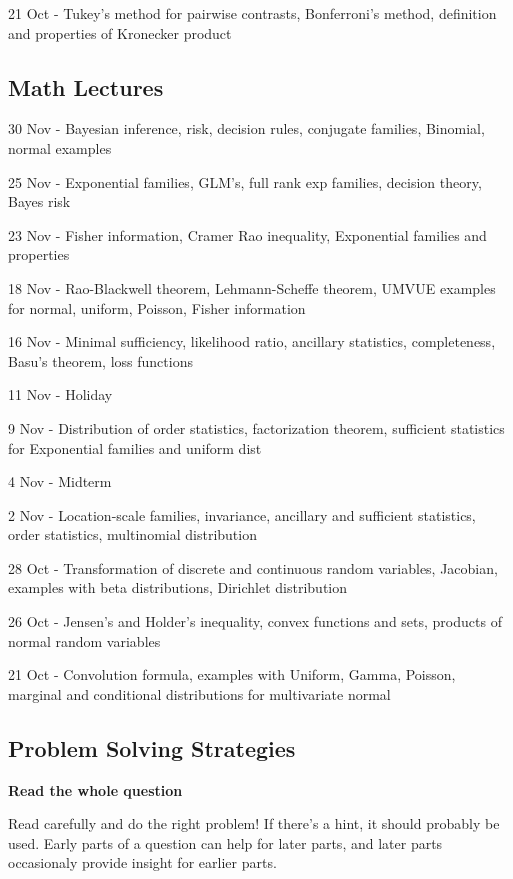 \documentclass[10pt, twocolumn]{article}
\begin{document}
21 Oct - Tukey's method for pairwise contrasts, Bonferroni's method,
definition and properties of Kronecker product

\subsection{Math Lectures}

30 Nov - Bayesian inference, risk, decision rules, conjugate families,
Binomial, normal examples

25 Nov - Exponential families, GLM's, full rank exp families, decision
theory, Bayes risk

23 Nov - Fisher information, Cramer Rao inequality, Exponential families
and properties

18 Nov - Rao-Blackwell theorem, Lehmann-Scheffe theorem, UMVUE examples for
normal, uniform, Poisson, Fisher information

16 Nov - Minimal sufficiency, likelihood ratio, ancillary statistics,
completeness, Basu's theorem, loss functions

11 Nov - Holiday

9 Nov - Distribution of order statistics, factorization theorem, sufficient
statistics for Exponential families and uniform dist

4 Nov - Midterm

2 Nov - Location-scale families, invariance, ancillary and sufficient
statistics, order statistics, multinomial distribution

28 Oct - Transformation of discrete and continuous random variables,
Jacobian, examples with beta distributions, Dirichlet distribution

26 Oct - Jensen's and Holder's inequality, convex functions and sets,
products of normal random variables

21 Oct - Convolution formula, examples with Uniform, Gamma, Poisson,
marginal and conditional distributions for multivariate normal
\newpage

\subsection{Problem Solving Strategies}

\textbf{Read the whole question}

Read carefully and do the right problem! If there's a hint, it should
probably be used. Early parts of a question can help for later parts, and later
parts occasionaly provide insight for earlier parts.
\end{document}
